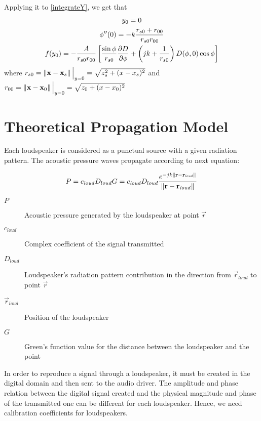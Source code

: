 Applying it to \autoref{integrateY}, we get that
\begin{gather}
	y_0 = 0 \\
	\phi''(0) = -k\frac{r_{s0} + r_{00}}{r_{s0} r_{00}} \\
	f(y_0) = -\frac{A}{r_{s0} r_{00}}\left[ \frac{\sin\phi}{r_{s0}} \frac{\partial\Diag}{\partial\phi} + \left(jk + \frac{1}{r_{s0}}\right) \Diag(\phi, 0) \cos\phi \right]
\end{gather}
where $r_{s0} = \left\| \mathbf{x} - \mathbf{x}_s \right\|\Big\vert_{y = 0} = \sqrt{z_s^2 + (x - x_s)^2}$ and $r_{00} = \left\| \mathbf{x} - \mathbf{x}_0 \right\|\Big\vert_{y = 0} = \sqrt{z_0 + (x - x_0)^2}$

\section{Theoretical Propagation Model}
\label{TheoreticalModelLabel}

Each loudspeaker is considered as a punctual source with a given radiation pattern. The acoustic pressure waves propagate according to next equation:

\begin{equation}
P = c_\mathit{loud} D_{loud} G = c_\mathit{loud} D_{loud} \frac{e^{-j k \left\| \mathbf{r} - \mathbf{r}_\mathit{loud} \right\|}}{\left\| \mathbf{r} - \mathbf{r}_\mathit{loud} \right\|}
\end{equation}

\begin{description}
	\item[$P$] Acoustic pressure generated by the loudspeaker at point $\vec{r}$
	\item[$c_\mathit{loud}$] Complex coefficient of the signal transmitted %
	\item[$D_{loud}$] Loudspeaker's radiation pattern contribution in the direction from $\vec{r}_\mathit{loud}$ to point $\vec{r}$%
	\item[$\vec{r}_{\mathit{loud}}$] Position of the loudspeaker
	\item[$G$] Green's function value for the distance between the loudspeaker and the point %
\end{description}

In order to reproduce a signal through a loudspeaker, it must be created in the digital domain and then sent to the audio driver. The amplitude and phase relation between the digital signal created and the physical magnitude and phase of the transmitted one can be different for each loudspeaker. Hence, we need calibration coefficients for loudspeakers.

